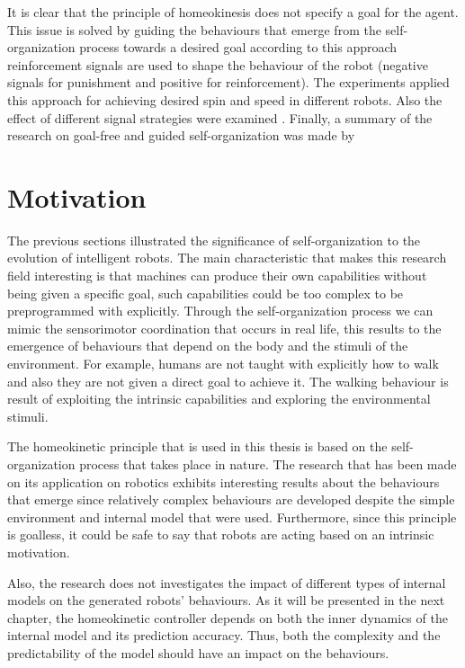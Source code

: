 \documentclass[msc,ai,logo]{infthesis}
\begin{document}
It is clear that the principle of homeokinesis does not specify a goal for the agent. This issue is solved by guiding the behaviours that emerge from the self-organization process towards a desired goal \citep{martius:guid} according to this approach reinforcement signals are used to shape the behaviour of the robot (negative signals for punishment and positive for reinforcement). The experiments applied this approach for achieving desired spin and speed in different robots. Also the effect of different signal strategies were examined \citep{martiusherrmann}. Finally, a summary of the research on goal-free and guided self-organization was made by \cite{DerMartius11}

\section{Motivation}   
The previous sections illustrated the significance of self-organization to the evolution of intelligent robots. The main characteristic that makes this research field interesting is that machines can produce their own capabilities without being given a specific goal, such capabilities could be too complex to be preprogrammed with explicitly. Through the self-organization process we can mimic the sensorimotor coordination that occurs in real life, this results to the emergence of behaviours that depend on the body and the stimuli of the environment. For example, humans are not taught with explicitly how to walk and also they are not given a direct goal to achieve it. The walking behaviour is result of exploiting the intrinsic capabilities and exploring the environmental stimuli.

The homeokinetic principle that is used in this thesis is based on the self-organization process that takes place in nature. The research that has been made on its application on robotics exhibits interesting results about the behaviours that emerge since relatively complex behaviours are developed despite the simple environment and internal model that were used. Furthermore, since this principle is goalless, it could be safe to say that robots are acting based on an intrinsic motivation. 

Also, the research does not investigates the impact of different types of internal models on the generated robots' behaviours. As it will be presented in the next chapter, the homeokinetic controller depends on both the inner dynamics of the internal model and its prediction accuracy. Thus, both the complexity and the predictability of the model should have an impact on the behaviours.
\end{document}
